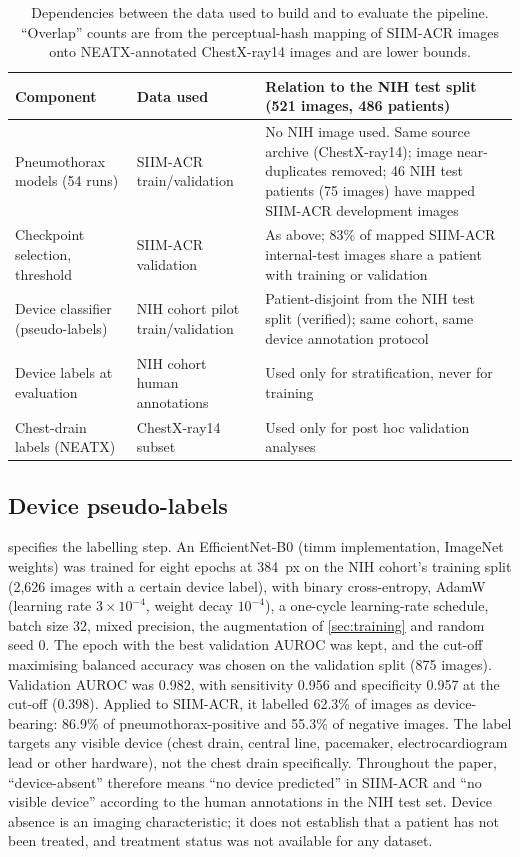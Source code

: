 \documentclass{ieeeaccess}
\begin{document}
\begin{table}[!t]
\centering\small
\caption{Dependencies between the data used to build and to evaluate the pipeline. ``Overlap'' counts are from the perceptual-hash mapping of SIIM-ACR images onto NEATX-annotated ChestX-ray14 images and are lower bounds.}
\label{tab:depend}
\begin{tabularx}{\linewidth}{@{}p{3.2cm} p{3.6cm} X@{}}
\toprule
Component & Data used & Relation to the NIH test split (521 images, 486 patients) \\
\midrule
Pneumothorax models (54 runs) & SIIM-ACR train/validation & No NIH image used. Same source archive (ChestX-ray14); image near-duplicates removed; 46 NIH test patients (75 images) have mapped SIIM-ACR development images \\
Checkpoint selection, threshold & SIIM-ACR validation & As above; 83\% of mapped SIIM-ACR internal-test images share a patient with training or validation \\
Device classifier (pseudo-labels) & NIH cohort pilot train/validation & Patient-disjoint from the NIH test split (verified); same cohort, same device annotation protocol \\
Device labels at evaluation & NIH cohort human annotations & Used only for stratification, never for training \\
Chest-drain labels (NEATX) & ChestX-ray14 subset & Used only for post hoc validation analyses \\
\bottomrule
\end{tabularx}
\end{table}

\subsection{Device pseudo-labels}
\label{sec:pseudo}
 specifies the labelling step. An EfficientNet-B0 \cite{tan2019efficientnet} (timm implementation, ImageNet weights) was trained for eight epochs at 384~px on the NIH cohort's training split (2{,}626 images with a certain device label), with binary cross-entropy, AdamW (learning rate $3\times10^{-4}$, weight decay $10^{-4}$), a one-cycle learning-rate schedule, batch size 32, mixed precision, the augmentation of \cref{sec:training} and random seed 0. The epoch with the best validation AUROC was kept, and the cut-off maximising balanced accuracy was chosen on the validation split (875 images). Validation AUROC was 0.982, with sensitivity 0.956 and specificity 0.957 at the cut-off (0.398). Applied to SIIM-ACR, it labelled 62.3\% of images as device-bearing: 86.9\% of pneumothorax-positive and 55.3\% of negative images. The label targets any visible device (chest drain, central line, pacemaker, electrocardiogram lead or other hardware), not the chest drain specifically. Throughout the paper, ``device-absent'' therefore means ``no device predicted'' in SIIM-ACR and ``no visible device'' according to the human annotations in the NIH test set. Device absence is an imaging characteristic; it does not establish that a patient has not been treated, and treatment status was not available for any dataset.
\end{document}
